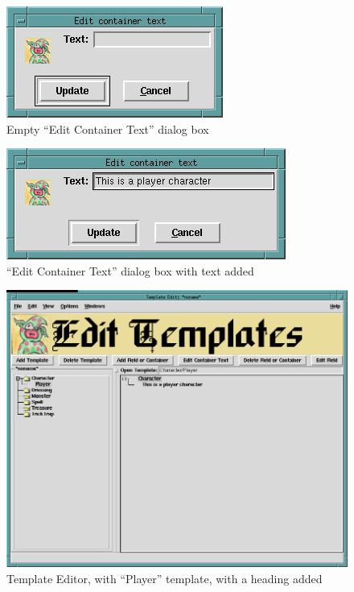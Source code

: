 \begin{figure}[hbpt]
\begin{centering}
\includegraphics{EmptyEditContainerText.png}
\caption{Empty ``Edit Container Text'' dialog box}
\label{fig:editcontainertext}
\end{centering}
\end{figure}
\begin{figure}[hbpt]
\begin{centering}
\includegraphics{EditContainerTextWithText.png}
\caption{``Edit Container Text'' dialog box with text added}
\label{fig:editcontainertextwithtext}
\end{centering}
\end{figure}
\begin{figure}[hbpt]
\begin{centering}
\includegraphics[width=5in]{PlayerTemplateEditorHeading.png}
\caption{Template Editor, with ``Player'' template, with a heading added}
\label{fig:playertemplateeditorwithheading}
\end{centering}
\end{figure}
